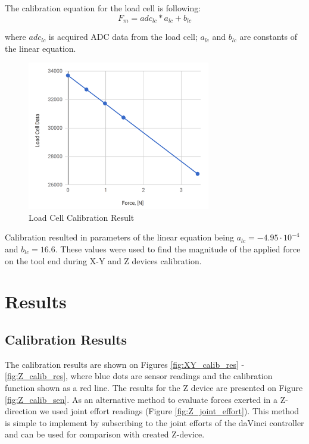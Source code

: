 	The calibration equation for the load cell is following:
\begin{equation}
F_{m} = adc_{lc}*a_{lc} + b_{lc}
\end{equation}

	where $adc_{lc}$ is acquired ADC data from the load cell; $a_{lc}$ and $b_{lc}$ are constants of the linear equation.

\begin{figure}[h]
	\begin{center}
	\includegraphics[width=80mm]{fig/methods/load_cell_calib_data.png}
	\end{center}
	\vspace{-4mm}
	\caption[Load Cell Calibration Result]
	{Load Cell Calibration Result}
	\label{fig:LC_calib_res}
	\vspace{-2mm}
\end{figure}

	Calibration resulted in parameters of the linear equation being  $a_{lc} = -4.95 \cdot 10^{-4}$ and $b_{lc} = 16.6$. These values were used to find the magnitude of the applied force on the tool end during X-Y and Z devices calibration.

\section{Results}
\label{sec:res}

\subsection{Calibration Results}
\label{ssec:Cal_Res}

The calibration results are shown on Figures \ref{fig:XY_calib_res} - \ref{fig:Z_calib_res}, where blue dots are sensor readings and the calibration function shown as a red line. The results for the Z device are presented on Figure \ref{fig:Z_calib_sen}. As an alternative method to evaluate forces exerted in a Z-direction we used joint effort readings (Figure \ref{fig:Z_joint_effort}). This method is simple to implement by subscribing to the joint efforts of the daVinci controller and can be used for comparison with created Z-device.

